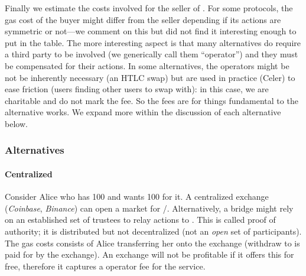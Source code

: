 Finally we estimate the costs involved for the seller of \ethtwo. For some protocols, the gas cost of the buyer might differ from the seller depending if its actions are symmetric or not---we comment on this but did not find it interesting enough to put in the table. The more interesting aspect is that many alternatives do require a third party to be involved (we generically call them ``operator'') and they must be compensated for their actions. In some alternatives, the operators might be not be inherently necessary (\eg an HTLC swap) but are used in practice (\eg Celer) to ease friction (\eg users finding other users to swap with): in this case, we are charitable and do not mark the fee. So the fees are for things fundamental to the alternative works. We expand more within the discussion of each alternative below. 

\subsubsection{Alternatives} 


\paragraph*{Centralized} Consider Alice who has 100 \ethtwo and wants 100 \ethone for it. A centralized exchange (\eg \textit{Coinbase}, \textit{Binance}) can open a market for \ethtwo/\ethone. Alternatively, a bridge might rely on an established set of trustees to relay \layertwo actions to \layerone. This is called proof of authority; it is distributed but not decentralized (\ie not an \textit{open} set of participants). The gas costs consists of Alice transferring her \ethtwo onto the exchange (withdraw to \layerone is paid for by the exchange). An exchange will not be profitable if it offers this for free, therefore it captures a operator fee for the service. 

